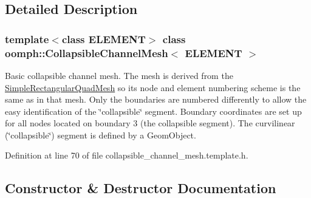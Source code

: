 \subsection{Detailed Description}
\subsubsection*{template$<$class E\+L\+E\+M\+E\+NT$>$\newline
class oomph\+::\+Collapsible\+Channel\+Mesh$<$ E\+L\+E\+M\+E\+N\+T $>$}

Basic collapsible channel mesh. The mesh is derived from the {\ttfamily \hyperlink{classoomph_1_1SimpleRectangularQuadMesh}{Simple\+Rectangular\+Quad\+Mesh}} so it\textquotesingle{}s node and element numbering scheme is the same as in that mesh. Only the boundaries are numbered differently to allow the easy identification of the \char`\"{}collapsible\char`\"{} segment. Boundary coordinates are set up for all nodes located on boundary 3 (the collapsible segment). The curvilinear (\char`\"{}collapsible\char`\"{}) segment is defined by a {\ttfamily Geom\+Object}. 

Definition at line 70 of file collapsible\+\_\+channel\+\_\+mesh.\+template.\+h.



\subsection{Constructor \& Destructor Documentation}
\mbox{\label{classoomph_1_1CollapsibleChannelMesh_a4e0b14ef4b4531f043b588150ca3c0f1}} 
